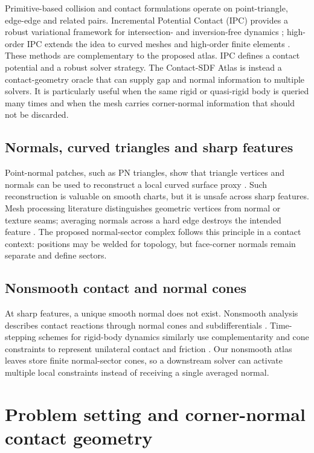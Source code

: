 \documentclass[preprint,12pt,sort&compress]{elsarticle}
\begin{document}
Primitive-based collision and contact formulations operate on point-triangle, edge-edge and related pairs. Incremental Potential Contact (IPC) provides a robust variational framework for intersection- and inversion-free dynamics \cite{Li2020IPC}; high-order IPC extends the idea to curved meshes and high-order finite elements \cite{Ferguson2023}. These methods are complementary to the proposed atlas. IPC defines a contact potential and a robust solver strategy. The Contact-SDF Atlas is instead a contact-geometry oracle that can supply gap and normal information to multiple solvers. It is particularly useful when the same rigid or quasi-rigid body is queried many times and when the mesh carries corner-normal information that should not be discarded.

\subsection{Normals, curved triangles and sharp features}

Point-normal patches, such as PN triangles, show that triangle vertices and normals can be used to reconstruct a local curved surface proxy \cite{Vlachos2001}. Such reconstruction is valuable on smooth charts, but it is unsafe across sharp features. Mesh processing literature distinguishes geometric vertices from normal or texture seams; averaging normals across a hard edge destroys the intended feature \cite{Botsch2010}. The proposed normal-sector complex follows this principle in a contact context: positions may be welded for topology, but face-corner normals remain separate and define sectors.

\subsection{Nonsmooth contact and normal cones}

At sharp features, a unique smooth normal does not exist. Nonsmooth analysis describes contact reactions through normal cones and subdifferentials \cite{Clarke1983,Moreau1988}. Time-stepping schemes for rigid-body dynamics similarly use complementarity and cone constraints to represent unilateral contact and friction \cite{StewartTrinkle1996,AnitescuPotra1997}. Our nonsmooth atlas leaves store finite normal-sector cones, so a downstream solver can activate multiple local constraints instead of receiving a single averaged normal.

\section{Problem setting and corner-normal contact geometry}
\label{sec:problem}
\end{document}
